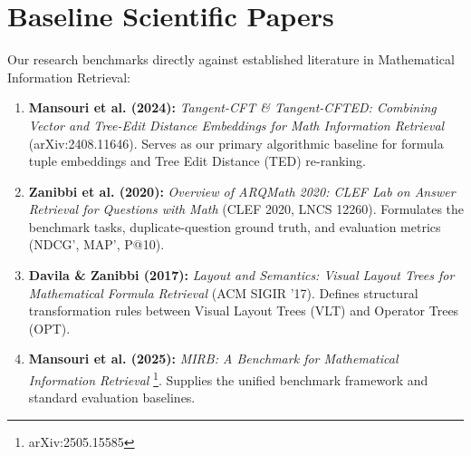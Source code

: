 \documentclass[11pt,a4paper]{article}
\begin{document}
\section{Baseline Scientific Papers}
Our research benchmarks directly against established literature in Mathematical Information Retrieval:
\begin{enumerate}
	\item \textbf{Mansouri et al. (2024):} \textit{Tangent-CFT \& Tangent-CFTED: Combining Vector and Tree-Edit Distance Embeddings for Math Information Retrieval} (arXiv:2408.11646). Serves as our primary algorithmic baseline for formula tuple embeddings and Tree Edit Distance (TED) re-ranking.
	\item \textbf{Zanibbi et al. (2020):} \textit{Overview of ARQMath 2020: CLEF Lab on Answer Retrieval for Questions with Math} (CLEF 2020, LNCS 12260). Formulates the benchmark tasks, duplicate-question ground truth, and evaluation metrics (NDCG', MAP', P@10).
	\item \textbf{Davila \& Zanibbi (2017):} \textit{Layout and Semantics: Visual Layout Trees for Mathematical Formula Retrieval} (ACM SIGIR '17). Defines structural transformation rules between Visual Layout Trees (VLT) and Operator Trees (OPT).
	\item \textbf{Mansouri et al. (2025):} \textit{MIRB: A Benchmark for Mathematical Information Retrieval} \footnote{arXiv:2505.15585}. Supplies the unified benchmark framework and standard evaluation baselines.
\end{enumerate}

\end{document}
